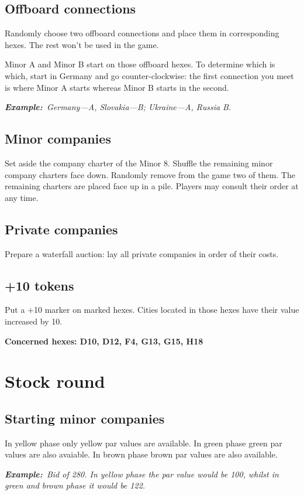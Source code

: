 \documentclass[10pt,a4paper,twocolumn]{article}
\newcommand{\Example}{\textbf{Example:}}
\begin{document}
\subsection{Offboard connections}
Randomly choose two offboard connections and place them in corresponding hexes. The rest won't be used in the game.

Minor A and Minor B start on those offboard hexes. To determine which is which, start in Germany and go counter-clockwise: the first connection you meet is where Minor A starts whereas Minor B starts in the second.

\textit{\Example~Germany—A, Slovakia—B; Ukraine—A, Russia B.}

\subsection{Minor companies}
Set aside the company charter of the Minor 8. Shuffle the remaining minor company charters face down. Randomly remove from the game two of them. The remaining charters are placed face up in a pile. Players may consult their order at any time. 

\subsection{Private companies}
Prepare a waterfall auction: lay all private companies in order of their costs.

\subsection{+10 tokens}
Put a +10 marker on marked hexes. Cities located in those hexes have their value increased by 10.

\textbf{Concerned hexes: D10, D12, F4, G13, G15, H18}


\section{Stock round}

\subsection{Starting minor companies}
In yellow phase only yellow par values are available. In green phase green par values are also avaiable. In brown phase brown par values are also available.

\textit{\Example~Bid of 280. In yellow phase the par value would be 100, whilst in green and brown phase it would be 122.}
\end{document}
